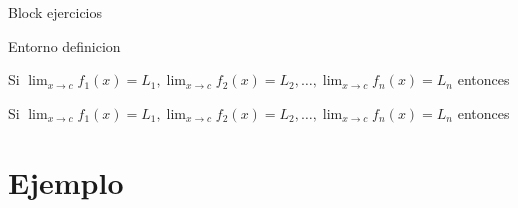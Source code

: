 \documentclass[]{beamer}
\theoremstyle{plain}
\begin{document}
\begin{frame}[fragile]{Block ejercicios}
\begin{source}{Entorno definicion}{}
\begin{definitions}
 Si \hspace{5pt}$\displaystyle \lim_{x\rightarrow c}f_1(x)=L_1, \displaystyle \lim_{x\rightarrow c}f_2(x)=L_2,\dots, \displaystyle \lim_{x\rightarrow c}f_n(x)=L_n $
 entonces
\end{definitions}
\end{source}
\begin{ejercicios}
 Si \hspace{5pt}$\displaystyle \lim_{x\rightarrow c}f_1(x)=L_1, \displaystyle \lim_{x\rightarrow c}f_2(x)=L_2,\dots, \displaystyle \lim_{x\rightarrow c}f_n(x)=L_n $
 entonces
\end{ejercicios}
\end{frame}
\section{Ejemplo}
\end{document}
